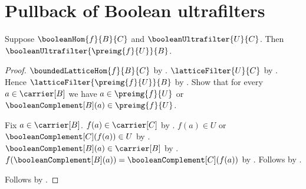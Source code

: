 \section{Pullback of Boolean ultrafilters}





\begin{theorem}\label{boolean_hom_preimage_boolean_ultrafilter}
    Suppose $\booleanHom{f}{B}{C}$ and
        $\booleanUltrafilter{U}{C}$.
    Then $\booleanUltrafilter{\preimg{f}{U}}{B}$.
\end{theorem}
\begin{proof}
    $\boundedLatticeHom{f}{B}{C}$ by
        .
    $\latticeFilter{U}{C}$ by
        .
    Hence $\latticeFilter{\preimg{f}{U}}{B}$ by
        .
    Show that for every $a\in\carrier[B]$ we have
        $a\in\preimg{f}{U}$ or
            $\booleanComplement[B](a)\in\preimg{f}{U}$.
    \begin{subproof}
        Fix $a\in\carrier[B]$.
        $f(a)\in\carrier[C]$ by .
        $f(a)\in U$ or $\booleanComplement[C](f(a))\in U$ by
            .
        $\booleanComplement[B](a)\in\carrier[B]$ by
            .
        $f(\booleanComplement[B](a))
            =\booleanComplement[C](f(a))$ by
            .
        Follows by .
    \end{subproof}
    Follows by
        .
\end{proof}
